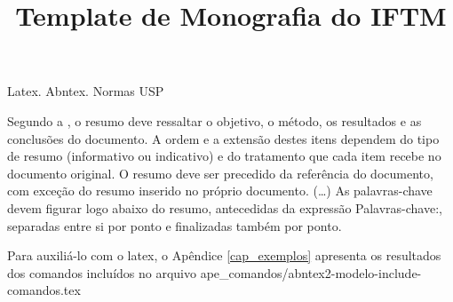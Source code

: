 \documentclass[tcc]{iftm} %
\title{Template de Monografia do IFTM}
\begin{document}
\pretextual

\maketitle






\begin{resumo}{Latex. Abntex. Normas USP}

 	 Segundo a , o resumo deve ressaltar o  objetivo, o método, os resultados e as conclusões do documento. A ordem e a extensão  destes itens dependem do tipo de resumo (informativo ou indicativo) e do  tratamento que cada item recebe no documento original. O resumo deve ser  precedido da referência do documento, com exceção do resumo inserido no  próprio documento. (\ldots) As palavras-chave devem figurar logo abaixo do  resumo, antecedidas da expressão Palavras-chave:, separadas entre si por  ponto e finalizadas também por ponto.
     
    Para auxiliá-lo com o latex, o Apêndice 
  \ref{cap_exemplos} apresenta os resultados dos comandos incluídos no arquivo ape\_comandos/abntex2-modelo-include-comandos.tex 

\end{resumo}
\end{document}
